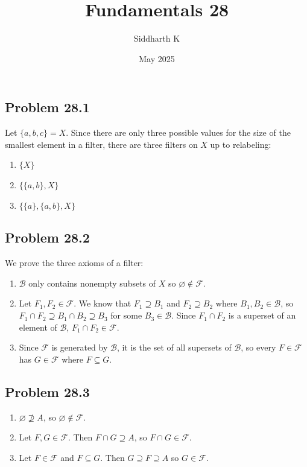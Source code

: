 \documentclass{article}
\title{Fundamentals 28}
\author{Siddharth K}
\date{May 2025}
\newcommand{\F}{\mathcal{F}}
\newcommand{\B}{\mathcal{B}}
\newcommand{\nullset}{\varnothing}
\begin{document}
\maketitle

\subsection*{Problem 28.1}
Let $\{a, b, c\} = X$. Since there are only three possible values for the size of the smallest element in a filter, there are three filters on $X$ up to relabeling:
\begin{enumerate}
    \item $\{X\}$
    \item $\{\{a, b\}, X\}$
    \item $\{\{a\}, \{a, b\}, X\}$
\end{enumerate}

\subsection*{Problem 28.2}
We prove the three axioms of a filter:
\begin{enumerate}
    \item $\B$ only contains nonempty subsets of $X$ so $\nullset \notin \F$.
    
    \item Let $F_1, F_2 \in \F$. We know that $F_1 \supseteq B_1$ and $F_2 \supseteq B_2$ where $B_1, B_2 \in \B$, so $F_1 \cap F_2 \supseteq B_1 \cap B_2 \supseteq B_3$ for some $B_3 \in \B$. Since $F_1 \cap F_2$ is a superset of an element of $\B$, $F_1 \cap F_2 \in \F$.
    
    \item Since $\F$ is generated by $\B$, it is the set of all supersets of $\B$, so every $F \in \F$ has $G \in \F$ where $F \subseteq G$.
\end{enumerate}

\subsection*{Problem 28.3}
\begin{enumerate}
    \item $\nullset \not\supseteq A$, so $\nullset \notin \F$.
    \item Let $F, G \in \F$. Then $F \cap G \supseteq A$, so $F \cap G \in \F$.
    \item Let $F \in \F$ and $F \subseteq G$. Then $G \supseteq F \supseteq A$ so $G \in \F$.
\end{enumerate}
\end{document}
